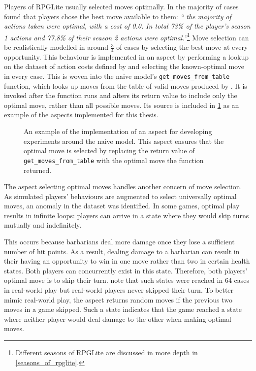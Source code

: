 Players of RPGLite usually selected moves optimally. In the majority of cases
\citet{kavanagh2021gameplay} found that players chose the best move available to
them: \emph{``\textelp{} the majority of actions taken were optimal, with a cost of
0.0. In total 73\% of the player's season 1 actions and 77.8\% of their season 2
actions were optimal.''}\footnote{Different seasons of RPGLite are discussed in
more depth in \cref{seasons_of_rpglite}.} Move selection can be realistically
modelled in around \(\frac{3}{4}\) of cases by selecting the best move at every
opportunity. This behaviour is implemented in an aspect by performing a lookup on
the dataset of action costs defined by \citet{kavanagh2021gameplay} and
selecting the known-optimal move in every case. This is woven into the naive
model's \lstinline{get_moves_from_table} function, which looks up moves from the
table of valid moves produced by \citet{kavanagh2021thesis}. It is invoked after
the function runs and alters its return value to include only the optimal move,
rather than all possible moves. Its source is included in
\cref{fig:best_move_aspect_source} as an example of the aspects implemented for this
thesis.

\begin{figure}[h]
  \centering
  
  \caption{An example of the implementation of an aspect for developing
  experiments around the naive model. This aspect ensures that the optimal move
  is selected by replacing the return value of \lstinline{get_moves_from_table}
  with the optimal move the function returned.}
  \label{fig:best_move_aspect_source}
\end{figure}

The aspect selecting optimal moves handles another concern of move
selection. As simulated players' behaviours are augmented to select universally
optimal moves, an anomaly in the dataset was identified. In some games, optimal
play results in infinite loops: players can arrive in a state where they would
skip turns mutually and indefinitely.

This occurs because barbarians deal more damage once they lose a sufficient
number of hit points. As a result, dealing damage to a barbarian can result in
their having an opportunity to win in one move rather than two in certain health
states. Both players can concurrently exist in this state. Therefore, both
players' optimal move is to skip their turn. \citeauthor{kavanagh2021gameplay}
note that such states were reached in 64 cases in real-world play but real-world
players never skipped their turn. To better mimic real-world play, the aspect
returns random moves if the previous two moves in a game skipped. Such a state
indicates that the game reached a state where neither player would deal damage
to the other when making optimal moves.


